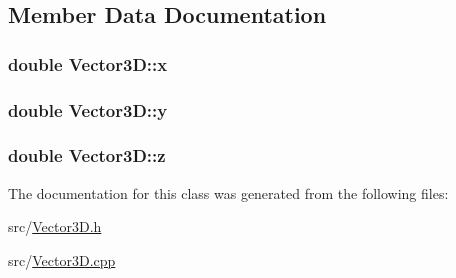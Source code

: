 \subsection{Member Data Documentation}
\subsubsection[{\texorpdfstring{x}{x}}]{\setlength{\rightskip}{0pt plus 5cm}double Vector3\+D\+::x\hspace{0.3cm}{\ttfamily [protected]}}\hypertarget{classVector3D_a3c086dfccfc57dd996e9b8600098a430}{}\label{classVector3D_a3c086dfccfc57dd996e9b8600098a430}
\subsubsection[{\texorpdfstring{y}{y}}]{\setlength{\rightskip}{0pt plus 5cm}double Vector3\+D\+::y\hspace{0.3cm}{\ttfamily [protected]}}\hypertarget{classVector3D_adcec384756103d26d1181e45d5a0fd78}{}\label{classVector3D_adcec384756103d26d1181e45d5a0fd78}
\subsubsection[{\texorpdfstring{z}{z}}]{\setlength{\rightskip}{0pt plus 5cm}double Vector3\+D\+::z\hspace{0.3cm}{\ttfamily [protected]}}\hypertarget{classVector3D_a7321f3ff785f275c4d83f7d1b951752a}{}\label{classVector3D_a7321f3ff785f275c4d83f7d1b951752a}


The documentation for this class was generated from the following files\+:\begin{DoxyCompactItemize}
\item 
src/\hyperlink{Vector3D_8h}{Vector3\+D.\+h}\item 
src/\hyperlink{Vector3D_8cpp}{Vector3\+D.\+cpp}\end{DoxyCompactItemize}
